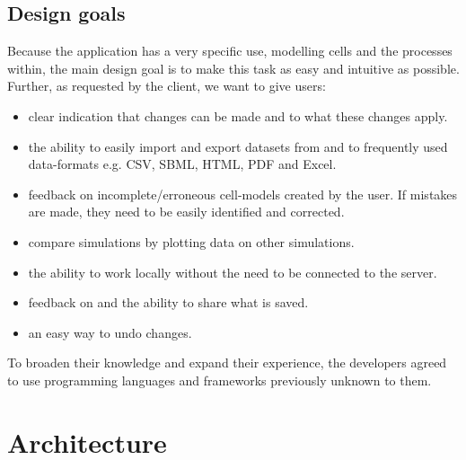 \documentclass{report}
\begin{document}
		\subsection{Design goals}
			Because the application has a very specific use, modelling cells and the processes within, the main design goal is to make this task as easy and intuitive as possible.
			Further, as requested by the client, we want to give users:
			\begin{itemize}
				\item clear indication that changes can be made and to what these changes apply.
				\item the ability to easily import and export datasets from and to frequently used data-formats e.g. CSV, SBML, HTML, PDF and Excel.
				\item feedback on incomplete/erroneous cell-models created by the user. If mistakes are made, they need to be easily identified and corrected.
				\item compare simulations by plotting data on other simulations.
				\item the ability to work locally without the need to be connected to the server.
				\item feedback on and the ability to share what is saved.
				\item an easy way to undo changes.
			\end{itemize}
			To broaden their knowledge and expand their experience, the developers agreed to use programming languages and frameworks previously unknown to them.
	\clearpage
	\section{Architecture}
			
\end{document}
